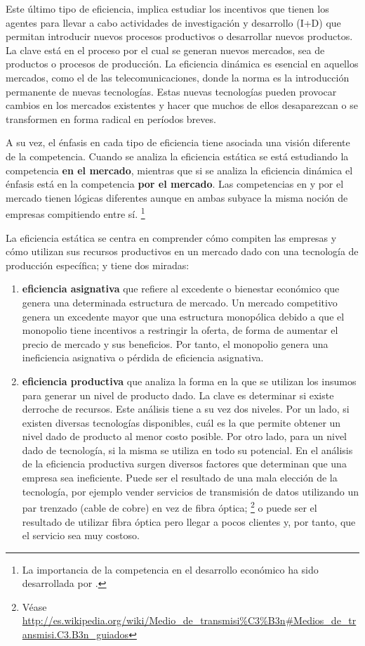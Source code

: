 \documentclass[
  12pt,
  spanish,
]{book}
\begin{document}
Este último tipo de eficiencia, implica estudiar los incentivos que tienen los agentes para llevar a cabo actividades de investigación y desarrollo (I+D) que permitan introducir nuevos procesos productivos o desarrollar nuevos productos. La clave está en el proceso por el cual se generan nuevos mercados, sea de productos o procesos de producción. La eficiencia dinámica es esencial en aquellos mercados, como el de las telecomunicaciones, donde la norma es la introducción permanente de nuevas tecnologías. Estas nuevas tecnologías pueden provocar cambios en los mercados existentes y hacer que muchos de ellos desaparezcan o se transformen en forma radical en períodos breves.

A su vez, el énfasis en cada tipo de eficiencia tiene asociada una visión diferente de la competencia. Cuando se analiza la eficiencia estática se está estudiando la competencia \textbf{en el mercado}, mientras que si se analiza la eficiencia dinámica el énfasis está en la competencia \textbf{por el mercado}. Las competencias en y por el mercado tienen lógicas diferentes aunque en ambas subyace la misma noción de empresas compitiendo entre sí.
\footnote{La importancia de la competencia en el desarrollo económico ha sido desarrollada por \citet{Aghion2005}.}

La eficiencia estática se centra en comprender cómo compiten las empresas y cómo utilizan sus recursos productivos en un mercado dado con una tecnología de producción específica; y tiene dos miradas:

\begin{enumerate}
\def\labelenumi{\arabic{enumi}.}
\item
  \textbf{eficiencia asignativa} que refiere al excedente o bienestar económico que genera una determinada estructura de mercado. Un mercado competitivo genera un excedente mayor que una estructura monopólica debido a que el monopolio tiene incentivos a restringir la oferta, de forma de aumentar el precio de mercado y sus beneficios. Por tanto, el monopolio genera una ineficiencia asignativa o pérdida de eficiencia asignativa.
\item
  \textbf{eficiencia productiva} que analiza la forma en la que se utilizan los insumos para generar un nivel de producto dado. La clave es determinar si existe derroche de recursos. Este análisis tiene a su vez dos niveles. Por un lado, si existen diversas tecnologías disponibles, cuál es la que permite obtener un nivel dado de producto al menor costo posible. Por otro lado, para un nivel dado de tecnología, si la misma se utiliza en todo su potencial. En el análisis de la eficiencia productiva surgen diversos factores que determinan que una empresa sea ineficiente. Puede ser el resultado de una mala elección de la tecnología, por ejemplo vender servicios de transmisión de datos utilizando
  un par trenzado (cable de cobre) en vez de fibra óptica;
  \footnote{Véase \url{http://es.wikipedia.org/wiki/Medio_de_transmisi\%C3\%B3n\#Medios_de_transmisi.C3.B3n_guiados}}
  o puede ser el resultado de utilizar fibra óptica pero llegar a pocos clientes y, por tanto, que el servicio sea muy costoso.
\end{enumerate}
\end{document}

